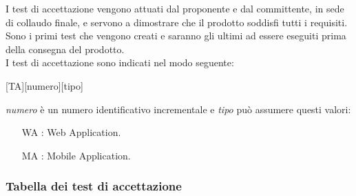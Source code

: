 \documentclass[../../piano-di-qualifica.tex]{subfiles}
\begin{document}
I test di accettazione vengono attuati dal proponente e dal committente, in sede di collaudo finale, e servono a dimostrare che il prodotto soddisfi tutti i requisiti.
Sono i primi test che vengono creati e saranno gli ultimi ad essere eseguiti prima della consegna del prodotto.\\

I test di accettazione sono indicati nel modo seguente:
\begin{center}
  [TA][numero][tipo]
\end{center}
\textit{numero} è un numero identificativo incrementale e \textit{tipo} può assumere questi valori:
\begin{itemize}
  \item [WA]: Web Application.
  \item [MA]: Mobile Application.
\end{itemize}

\newpage
\subsubsection{Tabella dei test di accettazione}%
\label{subsub:tabella_test_accettazione}
\end{document}
